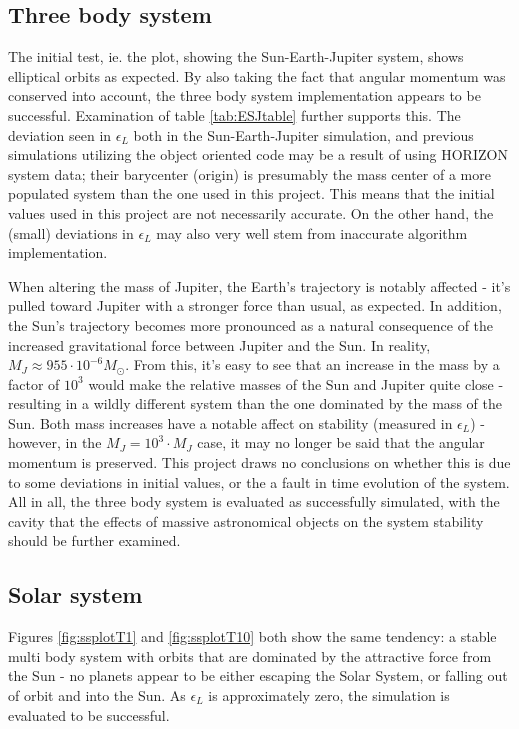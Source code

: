 \documentclass[%
oneside,                 %
final,                   %
10pt]{article}
\begin{document}
\subsection{Three body system}
\label{subsec:Discofres:3B}
The initial test, ie. the plot, showing the Sun-Earth-Jupiter system, shows elliptical orbits as expected. By also taking the fact that angular momentum was conserved into account, the three body system implementation appears to be successful. Examination of table \ref{tab:ESJtable} further supports this. The deviation seen in $\epsilon_L$ both in the Sun-Earth-Jupiter simulation, and previous simulations utilizing the object oriented code may be a result of using HORIZON system data; their barycenter (origin) is presumably the mass center of a more populated system than the one used in this project. This means that the initial values used in this project are not necessarily accurate. On the other hand, the (small) deviations in $\epsilon_L$ may also very well stem from inaccurate algorithm implementation. \newline

When altering the mass of Jupiter, the Earth's trajectory is notably affected - it's pulled toward Jupiter with a stronger force than usual, as expected. In addition, the Sun's trajectory becomes more pronounced as a natural consequence of the increased gravitational force between Jupiter and the Sun. In reality, $ M_{J}\approx 955 \cdot 10^{-6} M_{\odot}$. From this, it's easy to see that an increase in the mass by a factor of $10^3$ would make the relative masses of the Sun and Jupiter quite close - resulting in a wildly different system than the one dominated by the mass of the Sun. Both mass increases have a notable affect on stability (measured in $\epsilon_L$) - however, in the $M_J=10^3 \cdot M_J$ case, it may no longer be said that the angular momentum is preserved. This project draws no conclusions on whether this is due to some deviations in initial values, or the a fault in time evolution of the system. All in all, the three body system is evaluated as successfully simulated, with the cavity that the effects of massive astronomical objects on the system stability should be further examined.

\subsection{Solar system}
Figures \ref{fig:ssplotT1} and \ref{fig:ssplotT10} both show the same tendency: a stable multi body system with orbits that are dominated by the attractive force from the Sun - no planets appear to be either escaping the Solar System, or falling out of orbit and into the Sun. As $\epsilon_L$ is approximately zero, the simulation is evaluated to be successful. 
\end{document}
